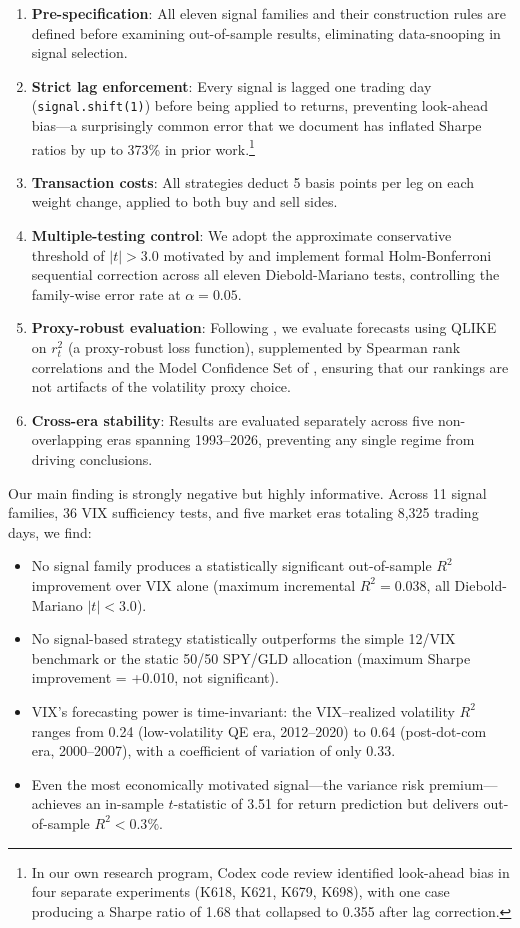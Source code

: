 \documentclass[12pt,a4paper]{article}
\begin{document}
\begin{enumerate}[label=(\roman*)]
    \item \textbf{Pre-specification}: All eleven signal families and their construction rules are defined before examining out-of-sample results, eliminating data-snooping in signal selection.
    \item \textbf{Strict lag enforcement}: Every signal is lagged one trading day (\texttt{signal.shift(1)}) before being applied to returns, preventing look-ahead bias---a surprisingly common error that we document has inflated Sharpe ratios by up to 373\% in prior work.\footnote{In our own research program, Codex code review identified look-ahead bias in four separate experiments (K618, K621, K679, K698), with one case producing a Sharpe ratio of 1.68 that collapsed to 0.355 after lag correction.}
    \item \textbf{Transaction costs}: All strategies deduct 5 basis points per leg on each weight change, applied to both buy and sell sides.
    \item \textbf{Multiple-testing control}: We adopt the approximate conservative threshold of $|t| > 3.0$ motivated by \citet{harvey2016} and implement formal Holm-Bonferroni sequential correction across all eleven Diebold-Mariano tests, controlling the family-wise error rate at $\alpha = 0.05$.
    \item \textbf{Proxy-robust evaluation}: Following \citet{patton2011}, we evaluate forecasts using QLIKE on $r_t^2$ (a proxy-robust loss function), supplemented by Spearman rank correlations and the Model Confidence Set of \citet{hansen2011mcs}, ensuring that our rankings are not artifacts of the volatility proxy choice.
    \item \textbf{Cross-era stability}: Results are evaluated separately across five non-overlapping eras spanning 1993--2026, preventing any single regime from driving conclusions.
\end{enumerate}

Our main finding is strongly negative but highly informative. Across 11 signal families, 36 VIX sufficiency tests, and five market eras totaling 8,325 trading days, we find:

\begin{itemize}
    \item No signal family produces a statistically significant out-of-sample $R^2$ improvement over VIX alone (maximum incremental $R^2 = 0.038$, all Diebold-Mariano $|t| < 3.0$).
    \item No signal-based strategy statistically outperforms the simple 12/VIX benchmark or the static 50/50 SPY/GLD allocation (maximum Sharpe improvement = +0.010, not significant).
    \item VIX's forecasting power is time-invariant: the VIX--realized volatility $R^2$ ranges from 0.24 (low-volatility QE era, 2012--2020) to 0.64 (post-dot-com era, 2000--2007), with a coefficient of variation of only 0.33.
    \item Even the most economically motivated signal---the variance risk premium---achieves an in-sample $t$-statistic of 3.51 for return prediction but delivers out-of-sample $R^2 < 0.3\%$.
\end{itemize}
\end{document}
